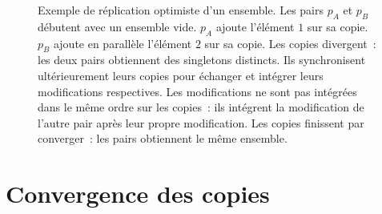 \begin{figure}[htb]
\newcommand*\hsep{2.2}
\newcommand*\vsep{-1.4}
\centering
{}
\caption[Réplication optimiste d'un ensemble]{Exemple de réplication optimiste d'un ensemble.
Les pairs $p_A$ et $p_B$ débutent avec un ensemble vide.
$p_A$ ajoute l'élément $1$ sur sa copie.
$p_B$ ajoute en parallèle l'élément $2$ sur sa copie.
Les copies divergent~: les deux pairs obtiennent des singletons distincts.
Ils synchronisent ultérieurement leurs copies pour échanger et intégrer leurs modifications respectives.
Les modifications ne sont pas intégrées dans le même ordre sur les copies~: ils intégrent la modification de l'autre pair après leur propre modification.
Les copies finissent par converger~: les pairs obtiennent le même ensemble.}\label{fig:optimistic-replication}
\end{figure}


\section{Convergence des copies}\label{sec:convergence}



